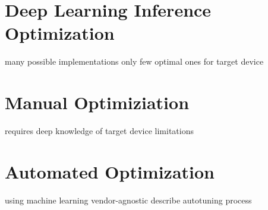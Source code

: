 \section{Deep Learning Inference Optimization}
many possible implementations
only few optimal ones for target device
\section{Manual Optimiziation}
requires deep knowledge of target device
limitations
\section{Automated Optimization}
using machine learning
vendor-agnostic
describe autotuning process
